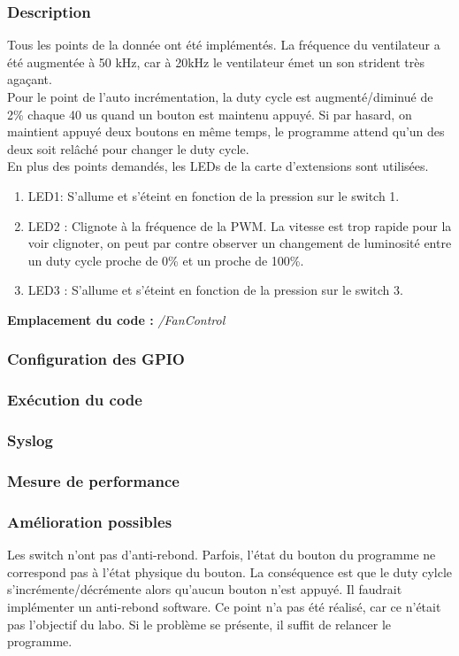 \subsubsection{Description}
Tous les points de la donnée ont été implémentés. La fréquence du ventilateur a été augmentée à 50 kHz, car à 20kHz le ventilateur émet un son strident très agaçant.\\Pour le point de l'auto incrémentation, la duty cycle est augmenté/diminué de 2\% chaque 40 us quand un bouton est maintenu appuyé. Si par hasard, on maintient appuyé deux boutons en même temps, le programme attend qu'un des deux soit relâché pour changer le duty cycle.\\En plus des points demandés, les LEDs de la carte d'extensions sont utilisées.
\begin{enumerate}
	\item LED1: S'allume et s'éteint en fonction de la pression sur le switch 1.
	\item LED2 : Clignote à la fréquence de la PWM. La vitesse est trop rapide pour la voir clignoter, on peut par contre observer un changement de luminosité entre un duty cycle proche de 0\% et un proche de 100\%.
	\item LED3 : S'allume et s'éteint en fonction de la pression sur le switch 3.\\
\end{enumerate} 

\textbf{Emplacement du code : } \textit{/FanControl}

\subsubsection{Configuration des GPIO}

\subsubsection{Exécution du code}

\subsubsection{Syslog}

\subsubsection{Mesure de performance}

\subsubsection{Amélioration possibles}
Les switch n'ont pas d'anti-rebond. Parfois, l'état du bouton du programme ne correspond pas à l'état physique du bouton. La conséquence est que le duty cylcle s'incrémente/décrémente alors qu'aucun bouton n'est appuyé. Il faudrait implémenter un anti-rebond software. Ce point n'a pas été réalisé, car ce n'était pas l'objectif du labo. Si le problème se présente, il suffit de relancer le programme.